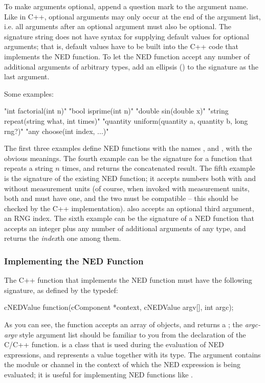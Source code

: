 To make arguments optional, append a question mark to the argument name.
Like in C++, optional arguments may only occur at the end of the argument
list, i.e. all arguments after an optional argument must also be optional.
The signature string does not have syntax for supplying default values for
optional arguments; that is, default values have to be built into the C++
code that implements the NED function. To let the NED function accept any
number of additional arguments of arbitrary types, add an ellipsis
() to the signature as the last argument.

Some examples:

\begin{cpp}
"int factorial(int n)"
"bool isprime(int n)"
"double sin(double x)"
"string repeat(string what, int times)"
"quantity uniform(quantity a, quantity b, long rng?)"
"any choose(int index, ...)"
\end{cpp}

The first three examples define NED functions with the names ,
 and , with the obvious meanings. The fourth example
can be the signature for a function that repeats a string $n$ times, and
returns the concatenated result. The fifth example is the signature of the
existing  NED function; it accepts numbers both with and without
measurement units (of course, when invoked with measurement units, both 
and  must have one, and the two must be compatible -- this should be checked
by the C++ implementation).  also accepts an optional third argument,
an RNG index. The sixth example can be the signature of a 
NED function that accepts an integer plus any number of additional arguments
of any type, and returns the \textit{index}th one among them.

\subsubsection{Implementing the NED Function}

The C++ function that implements the NED function must have the following
signature, as defined by the  typedef:

\begin{cpp}
cNEDValue function(cComponent *context, cNEDValue argv[], int argc);
\end{cpp}

As you can see, the function accepts an array of 
objects, and returns a ; the \textit{argc-argv} style
argument list should be familiar to you from the declaration of the C/C++
 function.  is a class that is used during
the evaluation of NED expressions, and represents a value together with its
type.  The  argument contains the module or channel in the
context of which the NED expression is being evaluated; it is useful for
implementing NED functions like .

